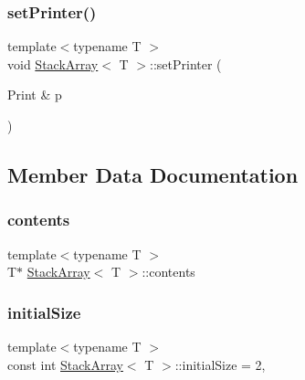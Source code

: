 \mbox{\label{class_stack_array_ae33d213467bb0cce1b103b99065cc8a3}} 
\subsubsection{\texorpdfstring{set\+Printer()}{setPrinter()}}
{\footnotesize\ttfamily template$<$typename T $>$ \\
void \mbox{\hyperlink{class_stack_array}{Stack\+Array}}$<$ T $>$\+::set\+Printer (\begin{DoxyParamCaption}\item[{Print \&}]{p }\end{DoxyParamCaption})}



\subsection{Member Data Documentation}
\mbox{\label{class_stack_array_acdd1139a57e63bcd8107622f21b863ac}} 
\subsubsection{\texorpdfstring{contents}{contents}}
{\footnotesize\ttfamily template$<$typename T $>$ \\
T$\ast$ \mbox{\hyperlink{class_stack_array}{Stack\+Array}}$<$ T $>$\+::contents\hspace{0.3cm}{\ttfamily [private]}}

\mbox{\label{class_stack_array_afaed95b05d5b775799d9c4395b253e27}} 
\subsubsection{\texorpdfstring{initial\+Size}{initialSize}}
{\footnotesize\ttfamily template$<$typename T $>$ \\
const int \mbox{\hyperlink{class_stack_array}{Stack\+Array}}$<$ T $>$\+::initial\+Size = 2\hspace{0.3cm}{\ttfamily [static]}, {\ttfamily [private]}}

